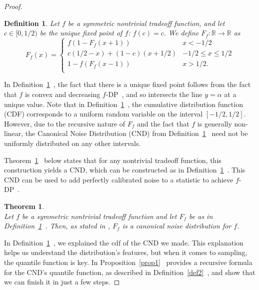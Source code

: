 \documentclass{article}
\newtheorem{thm}{Theorem}
\newtheorem{defn}{Definition}
\begin{document}
\begin{proof}
\begin{defn} \label{def1}  %
Let $f$ be a symmetric nontrivial tradeoff function, and let {$c\in [0,1/2)$} be the unique fixed point of $f$: $f(c)=c$. 
We define $F_f:\mathbb{R}\rightarrow \mathbb{R}$ as  \[ F_f(x) = \begin{cases}
    f(1-F_f(x+1))&x<-1/2\\
    c(1/2-x) + (1-c)(x+1/2)&-1/2\leq x\leq 1/2\\
    1-f(F_f(x-1))&x>1/2.\\
\end{cases}\]
\end{defn}
In Definition~\ref{def1}~\parencite{awan2023canonical}, 
the fact that there is a unique fixed point follows from the fact that $f$ is convex and decreasing $f$-DP~\parencite{dong2019gaussian}, 
and so intersects the line $y=\alpha$ at a unique value. 
Note that in Definition~\ref{def1}~\parencite{awan2023canonical}, 
the cumulative distribution function (CDF) corresponds to a uniform random variable on the interval $[-1/2,1/2]$. 
However, due to the recursive nature of $F_f$ and the fact that $f$ is generally non-linear, 
the Canonical Noise Distribution (CND) from Definition~\ref{def1}~\parencite{awan2023canonical} need not be uniformly distributed on any other intervals.

Theorem~\ref{thm1}~\parencite{awan2023canonical} below states that for any nontrivial tradeoff function, 
this construction yields a CND, which can be constructed as in Definition~\ref{def1}~\parencite{awan2023canonical}. 
This CND can be used to add perfectly calibrated noise to a statistic to achieve $f$-DP~\parencite[Proposition~2.2]{dong2019gaussian}. 

\begin{thm} \label{thm1}  %
\cite[Theorem~3.9]{awan2023canonical} \\
Let $f$ be a symmetric nontrivial tradeoff function and let $F_f$ be as in Definition~\ref{def1}~\parencite{awan2023canonical}. 
Then, as stated in \parencite[Theorem~3.9]{awan2023canonical}, $F_f$ is a canonical noise distribution for $f$. 
\end{thm}

In Definition~\ref{def1}~\parencite{awan2023canonical}, we explained the cdf of the CND we made. 
This explanation helps us understand the distribution's features, but when it comes to sampling, the quantile function is key. 
In Proposition~\ref{prop1}~\parencite{awan2023canonical} provides a recursive formula for the CND's quantile function,
as described in Definition~\ref{def2}~\parencite{awan2023canonical}, and show that we can finish it in just a few steps.


\end{proof}
\end{document}

